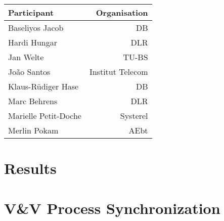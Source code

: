 \documentclass[a4paper]{article}
\begin{document}
\begin{tabular}{|l|r|}
  \hline
\textbf{Participant} & \textbf{Organisation}
\\\hline
Baseliyos Jacob& DB \\
Hardi Hungar & DLR \\
Jan Welte & TU-BS \\
Jo\~{a}o Santos & Institut Telecom \\
Klaus-R\"udiger Hase & DB \\
Marc Behrens & DLR \\
Marielle Petit-Doche & Systerel \\
Merlin Pokam & AEbt 
\\\hline
\end{tabular}

\pagebreak

\renewcommand{\contentsname}{Agenda}
\label{sec:agenda}
\tableofcontents


\section*{Results}


\section{V\&V Process Synchronization} %
\end{document}
